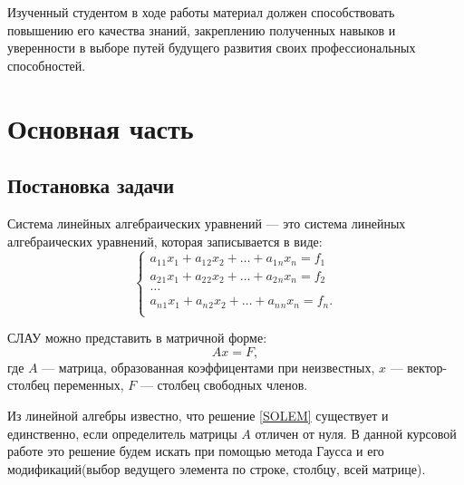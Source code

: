 \documentclass[14pt, a4paper]{extarticle}
\begin{document}
	Изученный студентом в ходе работы материал должен способствовать повышению его качества знаний, закреплению полученных навыков и уверенности в выборе путей будущего развития своих профессиональных способностей. 
	
	\section{Основная часть}
	\subsection{Постановка задачи}
	
	Система линейных алгебраических уравнений --- это система линейных алгебраических уравнений, которая записывается в виде:
	\begin{equation}\label{SOLE}
		\begin{cases}
			a_1{}_1 x_1 + a_1{}_2 x_2 + \ldots + a_1{}_n x_n = f_1 \\
			a_2{}_1 x_1 + a_2{}_2 x_2 + \ldots + a_2{}_n x_n = f_2 \\
			\ldots \\
			a_n{}_1 x_1 + a_n{}_2 x_2 + \ldots + a_n{}_n x_n = f_n. \\
		\end{cases}
	\end{equation}
	
	СЛАУ можно представить в матричной форме:
	\begin{equation}\label{SOLEM}
		A x = F,
	\end{equation}
	где $A$ --- матрица, образованная коэффицентами при неизвестных, $x$ --- вектор-столбец переменных, $F$ --- столбец свободных членов.
	
	Из линейной алгебры известно, что решение \eqref{SOLEM} существует и единственно, если определитель матрицы $A$ отличен от нуля. В данной курсовой работе это решение будем искать при помощью метода Гаусса и его модификаций(выбор ведущего элемента по строке, столбцу, всей матрице).
	
\end{document}
